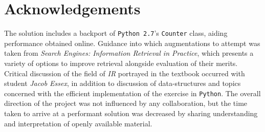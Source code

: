 \documentclass[10pt, a4paper, twocolumn]{article}   	%
\begin{document}
\section{Acknowledgements}
The solution includes a backport of \verb|Python 2.7|'s \verb|Counter| class, aiding performance \textendash{} obtained online.
Guidance into which augmentations to attempt was taken from \emph{Search Engines: Information Retrieval in Practice}, which presents a variety of options to improve retrieval alongside evaluation of their merits. Critical discussion of the field of \emph{IR} portrayed in the textbook occurred with student \emph{Jacob Essex}, in addition to discussion of data-structures and topics concerned with the efficient implementation of the exercise in \verb|Python|. The overall direction of the project was not influenced by any collaboration, but the time taken to arrive at a performant solution was decreased by sharing understanding and interpretation of openly available material.
\end{document}
